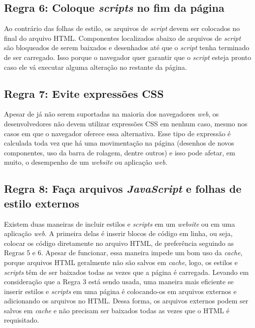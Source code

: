 \subsection{Regra 6: Coloque \textit{scripts} no fim da página}
\label{subsec:highperformance_regra6}
Ao contrário das folhas de estilo, os arquivos de \textit{script} devem ser colocados no final do arquivo HTML. Componentes localizados abaixo de arquivos de \textit{script} são bloqueados de serem baixados e desenhados até que o \textit{script} tenha terminado de ser carregado. Isso porque o navegador quer garantir que o \textit{script} esteja pronto caso ele vá executar alguma alteração no restante da página.

\subsection{Regra 7: Evite expressões CSS}
\label{subsec:highperformance_regra7}
Apesar de já não serem suportadas na maioria dos navegadores \textit{web}, os desenvolvedores não devem utilizar expressões CSS em nenhum caso, mesmo nos casos em que o navegador oferece essa alternativa. Esse tipo de expressão é calculada toda vez que há uma movimentação na página (desenhos de novos componentes, uso da barra de rolagem, dentre outros) e isso pode afetar, em muito, o desempenho de um \textit{website} ou aplicação \textit{web}.

\subsection{Regra 8: Faça arquivos \textit{JavaScript} e folhas de estilo externos}
\label{subsec:highperformance_regra8}
Existem duas maneiras de incluir estilos e \textit{scripts} em um \textit{website} ou em uma aplicação \textit{web}. A primeira delas é inserir blocos de código em linha, ou seja, colocar os código diretamente no arquivo HTML, de preferência seguindo as Regras 5 e 6. Apesar de funcionar, essa maneira impede um bom uso da \textit{cache}, porque arquivos HTML geralmente não são salvos em \textit{cache}, logo, os estilos e \textit{scripts} têm de ser baixados todas as vezes que a página é carregada. Levando em consideração que a Regra 3 está sendo usada, uma maneira mais eficiente se inserir estilos e \textit{scripts} em uma página é colocando-os em arquivos externos e adicionando os arquivos no HTML. Dessa forma, os arquivos externos podem ser salvos em \textit{cache} e não precisam ser baixados todas as vezes que o HTML é requisitado.

